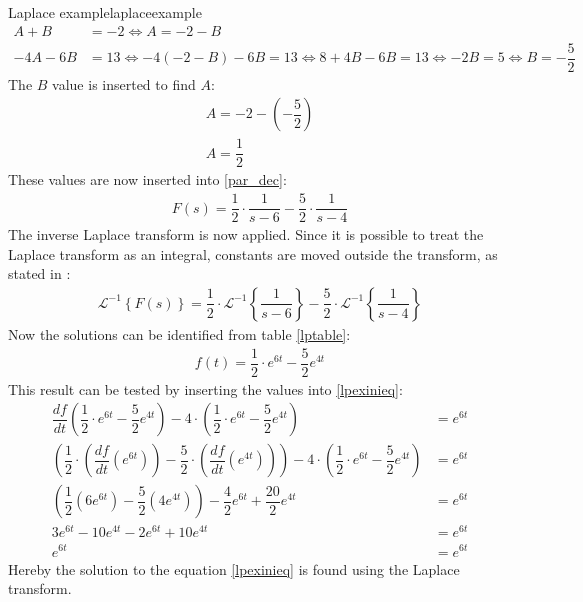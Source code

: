 \begin{example}{Laplace example}{laplaceexample}
\begin{align*}
A+B &=-2 \Leftrightarrow A=-2-B \\
-4A-6B &=13 \Leftrightarrow -4(-2-B)-6B = 13 \Leftrightarrow 8 + 4B - 6B = 13 \Leftrightarrow -2B = 5 \Leftrightarrow B = -\dfrac{5}{2}
\end{align*}
The $B$ value is inserted to find $A$:
\begin{align*}
A=-2- \left(-\dfrac{5}{2} \right) \\
A=\dfrac{1}{2}
\end{align*}
These values are now inserted into \eqref{par_dec}:
\begin{align*}
F(s) = \dfrac{1}{2} \cdot \dfrac{1}{s-6} - \dfrac{5}{2} \cdot \dfrac{1}{s-4}
\end{align*}
The inverse Laplace transform is now applied. Since it is possible to treat the Laplace transform as an integral, constants are moved outside the transform, as stated in :
\begin{align*}
\mathcal{L}^{-1} \left\{F(s) \right\} = \dfrac{1}{2} \cdot \mathcal{L}^{-1} \left\{\dfrac{1}{s-6} \right\} - \dfrac{5}{2} \cdot \mathcal{L}^{-1} \left\{\dfrac{1}{s-4} \right\}
\end{align*}
Now the solutions can be identified from table \ref{lptable}:
\begin{align*}
f(t) = \dfrac{1}{2} \cdot e^{6t} - \dfrac{5}{2}e^{4t}
\end{align*}
This result can be tested by inserting the values into \eqref{lpexinieq}:
\begin{align*}
\dfrac{df}{dt} \left(\dfrac{1}{2} \cdot e^{6t} - \dfrac{5}{2}e^{4t} \right) - 4 \cdot \left(\dfrac{1}{2} \cdot e^{6t} - \dfrac{5}{2}e^{4t} \right) &= e^{6t} \\
\left(\dfrac{1}{2} \cdot \left(\dfrac{df}{dt} \left(e^{6t} \right) \right) - \dfrac{5}{2} \cdot \left(\dfrac{df}{dt} \left(e^{4t} \right) \right) \right) - 4 \cdot \left(\dfrac{1}{2} \cdot e^{6t} - \dfrac{5}{2} e^{4t} \right) &= e^{6t} \\
\left(\dfrac{1}{2} \left(6e^{6t} \right) - \dfrac{5}{2} \left(4e^{4t} \right) \right) - \dfrac{4}{2}e^{6t}+\dfrac{20}{2}e^{4t}&= e^{6t}\\
3e^{6t}-10e^{4t}-2e^{6t}+10e^{4t} &= e^{6t} \\
e^{6t} &= e^{6t}
\end{align*}
Hereby the solution to the equation \eqref{lpexinieq} is found using the Laplace transform.
\end{example}